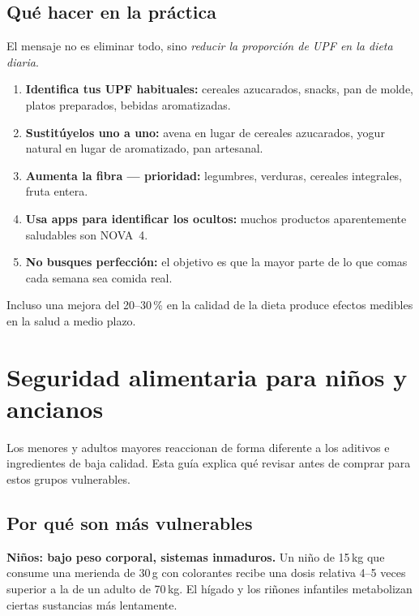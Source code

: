 \documentclass[a5paper,12pt,oneside,openany]{book}
\newcommand{\boxverde}[2]{%
  \begin{tcolorbox}[cajabase,
    colback=verdescuro!8!white, colframe=verdescuro, title={#1}]
  #2\end{tcolorbox}}
\begin{document}
\section{Qué hacer en la práctica}

El mensaje no es eliminar todo, sino \emph{reducir la proporción de UPF en
la dieta diaria}.

\begin{enumerate}
  \item \textbf{Identifica tus UPF habituales:} cereales azucarados, snacks,
    pan de molde, platos preparados, bebidas aromatizadas.
  \item \textbf{Sustitúyelos uno a uno:} avena en lugar de cereales azucarados,
    yogur natural en lugar de aromatizado, pan artesanal.
  \item \textbf{Aumenta la fibra --- prioridad:} legumbres, verduras, cereales
    integrales, fruta entera.
  \item \textbf{Usa apps para identificar los ocultos:} muchos productos
    aparentemente saludables son NOVA~4.
  \item \textbf{No busques perfección:} el objetivo es que la mayor parte de
    lo que comas cada semana sea comida real.
\end{enumerate}

\boxverde{Buenas noticias}{Incluso una mejora del 20--30\,\% en la calidad
de la dieta produce efectos medibles en la salud a medio plazo.}

\chapter{Seguridad alimentaria para niños y ancianos}

Los menores y adultos mayores reaccionan de forma diferente a los aditivos
e ingredientes de baja calidad. Esta guía explica qué revisar antes de
comprar para estos grupos vulnerables.

\section{Por qué son más vulnerables}

\textbf{Niños: bajo peso corporal, sistemas inmaduros.} Un niño de 15\,kg que
consume una merienda de 30\,g con colorantes recibe una dosis relativa 4--5
veces superior a la de un adulto de 70\,kg. El hígado y los riñones
infantiles metabolizan ciertas sustancias más lentamente.
\end{document}
